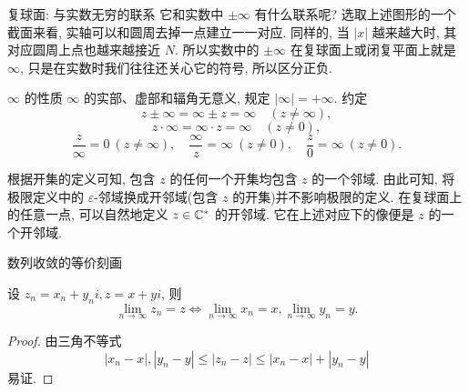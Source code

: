 \begin{frame}{复球面: 与实数无穷的联系}
\onslide<+->
它和实数中 $\pm\infty$ 有什么联系呢?
\onslide<+->
选取上述图形的一个截面来看, 实轴可以和圆周去掉一点建立一一对应.
\onslide<+->
同样的, 当 $|x|$ 越来越大时, 其对应圆周上点也越来越接近 $N$.
\onslide<+->
所以实数中的 $\pm\infty$ 在复球面上或闭复平面上就是 $\infty$, 只是在实数时我们往往还关心它的符号, 所以区分正负.

\begin{center}
\end{center}
\end{frame}


\begin{frame}{$\infty$ 的性质}
\onslide<+->
$\infty$ 的实部、虚部和辐角无意义, 规定 $|\infty|=+\infty$.
\onslide<+->
约定
\[z\pm \infty=\infty\pm z=\infty\quad (z\neq \infty),\]
\vspace{-\baselineskip}
\onslide<+->
\[z\cdot\infty=\infty\cdot z=\infty\quad (z\neq 0),\]
\vspace{-\baselineskip}
\onslide<+->
\[\frac z\infty=0\ (z\neq\infty),\quad
\frac\infty z=\infty\ (z\neq 0),\quad
\frac z0=\infty\ (z\neq 0).\]

\onslide<+->
根据开集的定义可知, 包含 $z$ 的任何一个开集均包含 $z$ 的一个邻域.
\onslide<+->
由此可知, 将极限定义中的 $\varepsilon$-邻域换成开邻域(包含 $z$ 的开集)并不影响极限的定义.
\onslide<+->
在复球面上的任意一点, 可以自然地定义 $z\in{\mathbb{C}}^*$ 的开邻域.
\onslide<+->
它在上述对应下的像便是 $z$ 的一个开邻域.
\end{frame}


\begin{frame}{数列收敛的等价刻画}
\begin{theorem}
设 $z_n=x_n+y_ni,z=x+yi$, 则
\[\lim_{n\to\infty}z_n=z\iff \lim_{n\to\infty}x_n=x,\lim_{n\to\infty}y_n=y.\]
\end{theorem}

\begin{proof}
由三角不等式
\[|x_n-x|,|y_n-y|\le|z_n-z|\le|x_n-x|+|y_n-y|\]
易证.
\end{proof}
\end{frame}


